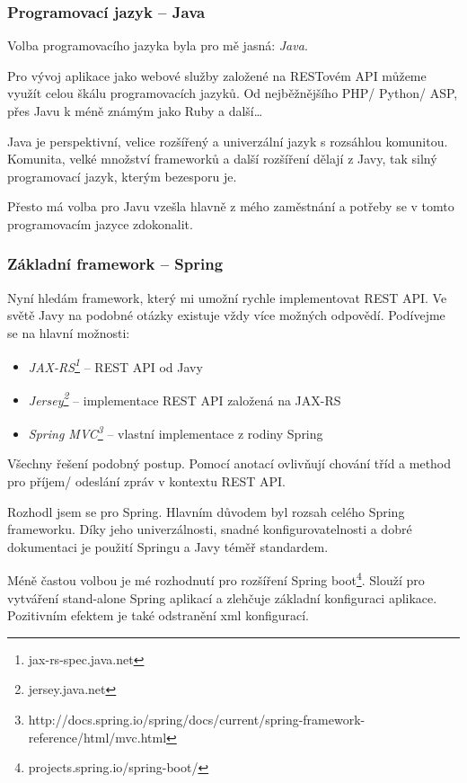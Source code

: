 \documentclass[thesis=B,czech]{FITthesis}[2012/06/26]
\begin{document}

\subsubsection{Programovací jazyk -- Java}

Volba programovacího jazyka byla pro mě jasná: \textit{Java}.

Pro vývoj aplikace jako webové služby založené na RESTovém API můžeme využít celou škálu programovacích jazyků. Od nejběžnějšího PHP/ Python/ ASP, přes Javu k méně známým jako Ruby a další\dots

Java je perspektivní, velice rozšířený a univerzální jazyk s rozsáhlou komunitou. Komunita, velké množství frameworků a další rozšíření dělají z Javy, tak silný programovací jazyk, kterým bezesporu je.  

Přesto má volba pro Javu vzešla hlavně z mého zaměstnání a potřeby se v tomto programovacím jazyce zdokonalit. 

\subsubsection{Základní framework -- Spring}

Nyní hledám framework, který mi umožní rychle implementovat REST API. Ve světě Javy na podobné otázky existuje vždy více možných odpovědí. 
Podívejme se na hlavní možnosti:
\begin{itemize}
	\item \textit{JAX-RS\footnote{jax-rs-spec.java.net}} -- REST API od Javy
    \item \textit{Jersey\footnote{jersey.java.net}} -- implementace REST API založená na JAX-RS
    \item \textit{Spring MVC\footnote{http://docs.spring.io/spring/docs/current/spring-framework-reference/html/mvc.html}} -- vlastní implementace z rodiny Spring
\end{itemize}

Všechny řešení podobný postup. Pomocí anotací ovlivňují chování tříd a method pro příjem/ odeslání zpráv v kontextu REST API. 

Rozhodl jsem se pro Spring. Hlavním důvodem byl rozsah celého Spring frameworku. Díky jeho univerzálnosti, snadné konfigurovatelnosti a dobré dokumentaci je použití Springu a Javy téměř standardem.    

Méně častou volbou je mé rozhodnutí pro rozšíření Spring boot\footnote{projects.spring.io/spring-boot/}. Slouží pro vytváření stand-alone Spring aplikací a zlehčuje základní konfiguraci aplikace. Pozitivním efektem je také odstranění \acrshort{xml} konfigurací.
\end{document}

